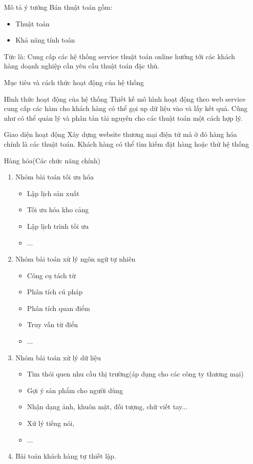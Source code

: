 \documentclass{beamer}
\begin{document}
\begin{frame}{Mô tả ý tưởng}
Bán thuật toán gồm:
\begin{itemize}
\item Thuật toán 
\item Khả năng tính toán 
\end{itemize}
Tức là: Cung cấp các hệ thống service thuật toán online hướng tới các khách hàng doạnh nghiệp cần yêu cầu thuật toán đặc thù.
\end{frame}
\begin{frame}{Mục tiêu và cách thức hoạt động của hệ thống}

\end{frame}
\begin{frame}{Hình thức hoạt động của hệ thống}
Thiết kế mô hình hoạt động theo web service cung cấp các hàm cho khách hàng có thể gọi up dữ liệu vào và lấy kết quả. Cũng như có thể quản lý và phân tán tài nguyên cho các thuật toán một cách hợp lý.

\end{frame}
\begin{frame}{Giao diện hoạt động}
Xây dựng website thương mại điện tử mà ở đó hàng hóa chính là các thuật toán. Khách hàng có thể tìm kiếm đặt hàng hoặc thử hệ thống
\end{frame}
\begin{frame}{Hàng hóa(Các chức năng chính)}
\begin{enumerate}
\item Nhóm bài toán tối ưu hóa
\begin{itemize}
\item Lập lịch sản xuất
\item Tối ưu hóa kho cảng
\item Lập lịch trình tối ưu
\item ...
\end{itemize}
\item Nhóm bài toán xử lý ngôn ngữ tự nhiên
\begin{itemize}
\item Công cụ tách từ
\item Phân tích cú pháp
\item Phân tích quan điểm
\item Truy vấn từ điển
\item ...
\end{itemize}
\item Nhóm bài toán xử lý dữ liệu
\begin{itemize}
\item Tìm thói quen nhu cầu thị trường(áp dụng cho các công ty thương mại)
\item Gợi ý sản phẩm cho người dùng
\item Nhận dạng ảnh, khuôn mặt, đối tượng, chữ viết tay...
\item Xử lý tiếng nói, 
\item ...
\end{itemize}
\item Bài toán khách hàng tự thiết lập.
\end{enumerate}
\end{frame}
\end{document}
